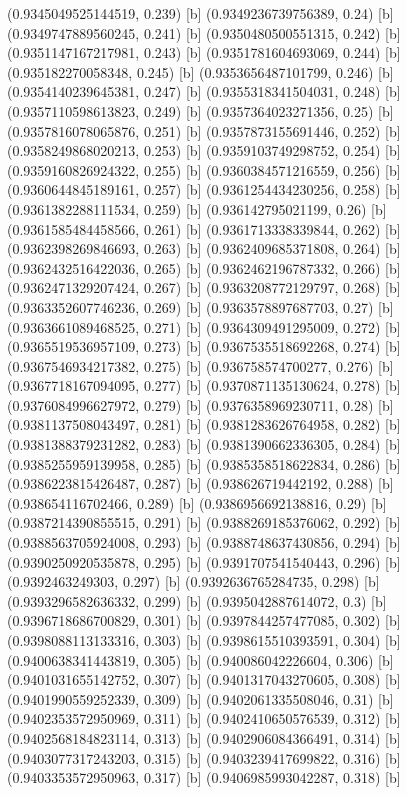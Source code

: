 {{{(0.9345049525144519, 0.239) [b] 
(0.9349236739756389, 0.24) [b] 
(0.9349747889560245, 0.241) [b] 
(0.9350480500551315, 0.242) [b] 
(0.9351147167217981, 0.243) [b] 
(0.9351781604693069, 0.244) [b] 
(0.935182270058348, 0.245) [b] 
(0.9353656487101799, 0.246) [b] 
(0.9354140239645381, 0.247) [b] 
(0.9355318341504031, 0.248) [b] 
(0.9357110598613823, 0.249) [b] 
(0.9357364023271356, 0.25) [b] 
(0.9357816078065876, 0.251) [b] 
(0.9357873155691446, 0.252) [b] 
(0.9358249868020213, 0.253) [b] 
(0.9359103749298752, 0.254) [b] 
(0.9359160826924322, 0.255) [b] 
(0.9360384571216559, 0.256) [b] 
(0.9360644845189161, 0.257) [b] 
(0.9361254434230256, 0.258) [b] 
(0.9361382288111534, 0.259) [b] 
(0.936142795021199, 0.26) [b] 
(0.9361585484458566, 0.261) [b] 
(0.9361713338339844, 0.262) [b] 
(0.9362398269846693, 0.263) [b] 
(0.9362409685371808, 0.264) [b] 
(0.9362432516422036, 0.265) [b] 
(0.9362462196787332, 0.266) [b] 
(0.9362471329207424, 0.267) [b] 
(0.9363208772129797, 0.268) [b] 
(0.9363352607746236, 0.269) [b] 
(0.9363578897687703, 0.27) [b] 
(0.9363661089468525, 0.271) [b] 
(0.9364309491295009, 0.272) [b] 
(0.9365519536957109, 0.273) [b] 
(0.9367535518692268, 0.274) [b] 
(0.9367546934217382, 0.275) [b] 
(0.936758574700277, 0.276) [b] 
(0.9367718167094095, 0.277) [b] 
(0.9370871135130624, 0.278) [b] 
(0.9376084996627972, 0.279) [b] 
(0.9376358969230711, 0.28) [b] 
(0.9381137508043497, 0.281) [b] 
(0.9381283626764958, 0.282) [b] 
(0.9381388379231282, 0.283) [b] 
(0.9381390662336305, 0.284) [b] 
(0.9385255959139958, 0.285) [b] 
(0.9385358518622834, 0.286) [b] 
(0.9386223815426487, 0.287) [b] 
(0.938626719442192, 0.288) [b] 
(0.938654116702466, 0.289) [b] 
(0.9386956692138816, 0.29) [b] 
(0.9387214390855515, 0.291) [b] 
(0.9388269185376062, 0.292) [b] 
(0.9388563705924008, 0.293) [b] 
(0.9388748637430856, 0.294) [b] 
(0.9390250920535878, 0.295) [b] 
(0.9391707541540443, 0.296) [b] 
(0.9392463249303, 0.297) [b] 
(0.9392636765284735, 0.298) [b] 
(0.9393296582636332, 0.299) [b] 
(0.9395042887614072, 0.3) [b] 
(0.9396718686700829, 0.301) [b] 
(0.9397844257477085, 0.302) [b] 
(0.9398088113133316, 0.303) [b] 
(0.9398615510393591, 0.304) [b] 
(0.9400638341443819, 0.305) [b] 
(0.940086042226604, 0.306) [b] 
(0.9401031655142752, 0.307) [b] 
(0.9401317043270605, 0.308) [b] 
(0.9401990559252339, 0.309) [b] 
(0.9402061335508046, 0.31) [b] 
(0.9402353572950969, 0.311) [b] 
(0.9402410650576539, 0.312) [b] 
(0.9402568184823114, 0.313) [b] 
(0.9402906084366491, 0.314) [b] 
(0.9403077317243203, 0.315) [b] 
(0.9403239417699822, 0.316) [b] 
(0.9403353572950963, 0.317) [b] 
(0.9406985993042287, 0.318) [b] 
}}}
